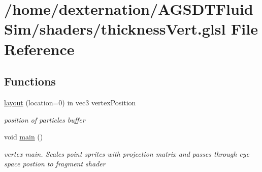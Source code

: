 \hypertarget{thickness_vert_8glsl}{\section{/home/dexternation/\-A\-G\-S\-D\-T\-Fluid\-Sim/shaders/thickness\-Vert.glsl File Reference}
\label{thickness_vert_8glsl}
}
\subsection*{Functions}
\begin{DoxyCompactItemize}
\item 
\hypertarget{thickness_vert_8glsl_a3a9bed495f596aa8aed4121aacc43fdd}{\hyperlink{thickness_vert_8glsl_a3a9bed495f596aa8aed4121aacc43fdd}{layout} (location=0) in vec3 vertex\-Position}\label{thickness_vert_8glsl_a3a9bed495f596aa8aed4121aacc43fdd}

\begin{DoxyCompactList}\small\item\em position of particles buffer \end{DoxyCompactList}\item 
\hypertarget{thickness_vert_8glsl_acdef7a1fd863a6d3770c1268cb06add3}{void \hyperlink{thickness_vert_8glsl_acdef7a1fd863a6d3770c1268cb06add3}{main} ()}\label{thickness_vert_8glsl_acdef7a1fd863a6d3770c1268cb06add3}

\begin{DoxyCompactList}\small\item\em vertex main. Scales point sprites with projection matrix and passes through eye space postion to fragment shader \end{DoxyCompactList}\end{DoxyCompactItemize}
